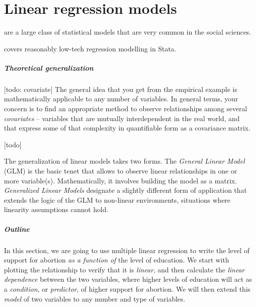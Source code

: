 %
%
\chapter[Linear models]{Linear regression models}%
	\label{ch:lin}%
  \startcontents[chapters]%
  \newpage

 are a large class of statistical models that are very common in the social sciences.%

 covers reasonably low-tech regression modelling in Stata.%


\paragraph{Theoretical generalization}

[todo: covariate]
The general idea that you get from the empirical example is mathematically applicable to any number of variables. In general terms, your concern is to find an appropriate method to observe relationships among several \emph{covariates} -- variables that are mutually interdependent in the real world, and that express some of that complexity in quantifiable form as a covariance matrix.


[todo]

The generalization of linear models takes two forms. The \emph{General Linear Model} (GLM) is the basic tenet that allows to observe linear relationships in one or more variable(s). Mathematically, it involves building the model as a matrix. \emph{Generalized Linear Models} designate a slightly different form of application that extends the logic of the GLM to non-linear environments, \ie situations where linearity assumptions cannot hold.


%
%

\paragraph{Outline}

In this section, we are going to use multiple linear regression to write the level of support for abortion \emph{as a function of} the level of education. We start with plotting the relationship to verify that it is \emph{linear}, and then calculate the \emph{linear dependence} between the two variables, where higher levels of education will act as a \emph{condition}, or \emph{predictor}, of higher support for abortion. We will then extend this \emph{model} of two variables to any number and type of variables.

